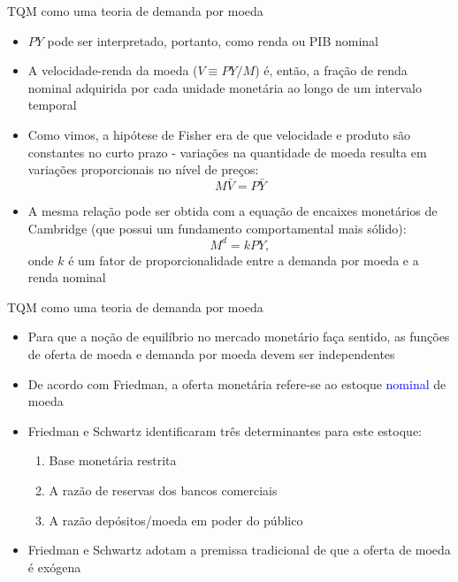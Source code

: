 \documentclass[10pt]{beamer}
\begin{document}
\begin{frame}{TQM como uma teoria de demanda por moeda}
    \begin{itemize}
        \item $PY$ pode ser interpretado, portanto, como renda ou PIB nominal
        \bigskip
        \item A velocidade-renda da moeda ($V \equiv PY/M$) é, então, a fração de renda nominal adquirida por cada unidade monetária ao longo de um intervalo temporal
        \bigskip
        \item Como vimos, a hipótese de Fisher era de que velocidade e produto são constantes no curto prazo - variações na quantidade de moeda resulta em variações proporcionais no nível de preços:
        \[
        M\bar{V} = P\bar{Y}
        \]
        \bigskip
        \item A mesma relação pode ser obtida com a equação de encaixes monetários de Cambridge (que possui um fundamento comportamental mais sólido):
        \[
        M^d = kPY,
        \]
        onde $k$ é um fator de proporcionalidade entre a demanda por moeda e a renda nominal
    \end{itemize}
\end{frame}

\begin{frame}{TQM como uma teoria de demanda por moeda}
    \begin{itemize}
        \item Para que a noção de equilíbrio no mercado monetário faça sentido, as funções de oferta de moeda e demanda por moeda devem ser independentes
        \bigskip
        \item De acordo com Friedman, a oferta monetária refere-se ao estoque \textcolor{blue}{nominal} de moeda
        \bigskip
        \item Friedman e Schwartz identificaram três determinantes para este estoque:
        \bigskip
        \begin{enumerate}
            \item Base monetária restrita
            \bigskip
            \item A razão de reservas dos bancos comerciais
            \bigskip
            \item A razão depósitos/moeda em poder do público
        \end{enumerate}
        \bigskip
        \item Friedman e Schwartz adotam a premissa tradicional de que a oferta de moeda é exógena
    \end{itemize}
\end{frame}
\end{document}
